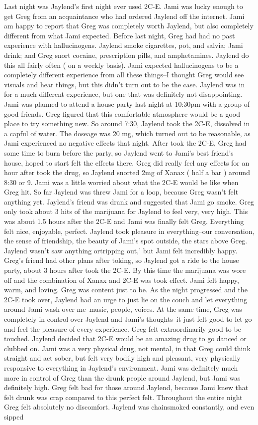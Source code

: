 \documentclass[12pt]{book}
\begin{document}
Last night was Jaylend's first night ever used 2C-E. Jami was lucky enough to get Greg from an acquaintance who had ordered Jaylend off the internet. Jami am happy to report that Greg was completely worth Jaylend, but also completely different from what Jami expected. Before last night, Greg had had no past experience with hallucinogens. Jaylend smoke cigarettes, pot, and salvia; Jami drink; and Greg snort cocaine, prescription pills, and amphetamines. Jaylend do this all fairly often ( on a weekly basis). Jami expected hallucinogens to be a completely different experience from all these things--I thought Greg would see visuals and hear things, but this didn't turn out to be the case. Jaylend was in for a much different experience, but one that was definitely not disappointing. Jami was planned to attend a house party last night at 10:30pm with a group of good friends. Greg figured that this comfortable atmosphere would be a good place to try something new. So around 7:30, Jaylend took the 2C-E, dissolved in a capful of water. The doseage was 20 mg, which turned out to be reasonable, as Jami experienced no negative effects that night. After took the 2C-E, Greg had some time to burn before the party, so Jaylend went to Jami's best friend's house, hoped to start felt the effects there. Greg did really feel any effects for an hour after took the drug, so Jaylend snorted 2mg of Xanax ( half a bar ) around 8:30 or 9. Jami was a little worried about what the 2C-E would be like when Greg hit. So far Jaylend was threw Jami for a loop, because Greg wasn't felt anything yet. Jaylend's friend was drank and suggested that Jami go smoke. Greg only took about 3 hits of the marijuana for Jaylend to feel very, very high. This was about 1.5 hours after the 2C-E and Jami was finally felt Greg. Everything felt nice, enjoyable, perfect. Jaylend took pleasure in everything--our conversation, the sense of friendship, the beauty of Jami's spot outside, the stars above Greg. Jaylend wasn't saw anything ortripping out,' but Jami felt incredibly happy. Greg's friend had other plans after toking, so Jaylend got a ride to the house party, about 3 hours after took the 2C-E. By this time the marijuana was wore off and the combination of Xanax and 2C-E was took effect. Jami felt happy, warm, and loving. Greg was content just to be. As the night progressed and the 2C-E took over, Jaylend had an urge to just lie on the couch and let everything around Jami wash over me--music, people, voices. At the same time, Greg was completely in control over Jaylend and Jami's thoughts--it just felt good to let go and feel the pleasure of every experience. Greg felt extraordinarily good to be touched. Jaylend decided that 2C-E would be an amazing drug to go danced or clubbed on. Jami was a very physical drug, not mental, in that Greg could think straight and act sober, but felt very bodily high and pleasant, very physically responsive to everything in Jaylend's environment. Jami was definitely much more in control of Greg than the drunk people around Jaylend, but Jami was definitely high. Greg felt bad for those around Jaylend, because Jami knew that felt drunk was crap compared to this perfect felt. Throughout the entire night Greg felt absolutely no discomfort. Jaylend was chainsmoked constantly, and even sipped 
\end{document}
